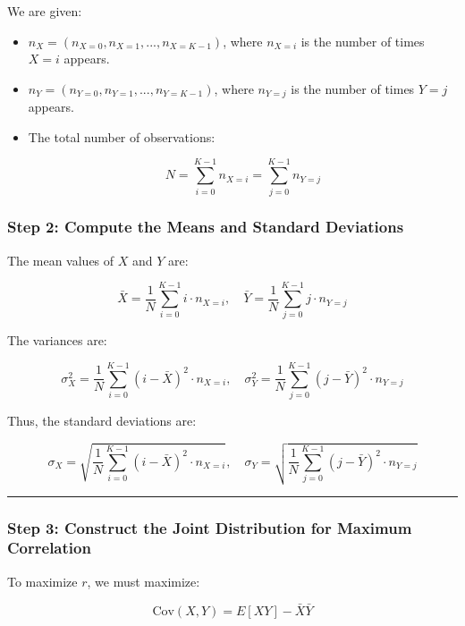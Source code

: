 \documentclass[
  12pt,
  letterpaper,
  DIV=11,
  numbers=noendperiod]{scrartcl}
\begin{document}
We are given:

\begin{itemize}
\item
  \(n_X = (n_{X=0}, n_{X=1}, ..., n_{X=K-1})\), where \(n_{X=i}\) is the
  number of times \(X = i\) appears.
\item
  \(n_Y = (n_{Y=0}, n_{Y=1}, ..., n_{Y=K-1})\), where \(n_{Y=j}\) is the
  number of times \(Y = j\) appears.
\item
  The total number of observations:

  \[N = \sum_{i=0}^{K-1} n_{X=i} = \sum_{j=0}^{K-1} n_{Y=j}\]
\end{itemize}

\subsubsection{\texorpdfstring{\textbf{Step 2: Compute the Means and
Standard
Deviations}}{Step 2: Compute the Means and Standard Deviations}}\label{step-2-compute-the-means-and-standard-deviations}

The mean values of \(X\) and \(Y\) are:

\[\bar{X} = \frac{1}{N} \sum_{i=0}^{K-1} i \cdot n_{X=i}, \quad  
\bar{Y} = \frac{1}{N} \sum_{j=0}^{K-1} j \cdot n_{Y=j}\]

The variances are:

\[\sigma_X^2 = \frac{1}{N} \sum_{i=0}^{K-1} (i - \bar{X})^2 \cdot n_{X=i}, \quad  
\sigma_Y^2 = \frac{1}{N} \sum_{j=0}^{K-1} (j - \bar{Y})^2 \cdot n_{Y=j}\]

Thus, the standard deviations are:

\[\sigma_X = \sqrt{\frac{1}{N} \sum_{i=0}^{K-1} (i - \bar{X})^2 \cdot n_{X=i}}, \quad  
\sigma_Y = \sqrt{\frac{1}{N} \sum_{j=0}^{K-1} (j - \bar{Y})^2 \cdot n_{Y=j}}\]

\begin{center}\rule{0.5\linewidth}{0.5pt}\end{center}

\subsubsection{\texorpdfstring{\textbf{Step 3: Construct the Joint
Distribution for Maximum
Correlation}}{Step 3: Construct the Joint Distribution for Maximum Correlation}}\label{step-3-construct-the-joint-distribution-for-maximum-correlation}

To maximize \(r\), we must maximize:

\[\text{Cov}(X,Y) = E[XY] - \bar{X} \bar{Y}\]
\end{document}
